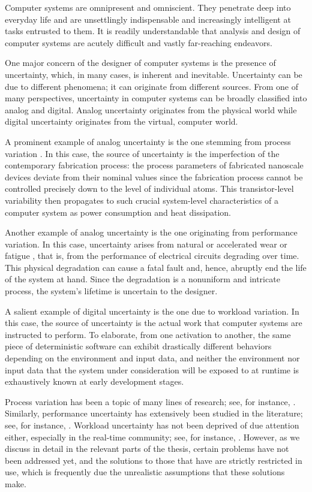 Computer systems are omnipresent and omniscient. They penetrate deep into
everyday life and are unsettlingly indispensable and increasingly intelligent at
tasks entrusted to them. It is readily understandable that analysis and design
of computer systems are acutely difficult and vastly far-reaching endeavors.

One major concern of the designer of computer systems is the presence of
uncertainty, which, in many cases, is inherent and inevitable. Uncertainty can
be due to different phenomena; it can originate from different sources. From one
of many perspectives, uncertainty in computer systems can be broadly classified
into analog and digital. Analog uncertainty originates from the physical world
while digital uncertainty originates from the virtual, computer world.

A prominent example of analog uncertainty is the one stemming from process
variation \cite{srivastava2010}. In this case, the source of uncertainty is the
imperfection of the contemporary fabrication process: the process parameters of
fabricated nanoscale devices deviate from their nominal values since the
fabrication process cannot be controlled precisely down to the level of
individual atoms. This transistor-level variability then propagates to such
crucial system-level characteristics of a computer system as power consumption
and heat dissipation.

Another example of analog uncertainty is the one originating from performance
variation. In this case, uncertainty arises from natural or accelerated wear or
fatigue \cite{jedec2016}, that is, from the performance of electrical circuits
degrading over time. This physical degradation can cause a fatal fault and,
hence, abruptly end the life of the system at hand. Since the degradation is a
nonuniform and intricate process, the system's lifetime is uncertain to the
designer.

A salient example of digital uncertainty is the one due to workload variation.
In this case, the source of uncertainty is the actual work that computer systems
are instructed to perform. To elaborate, from one activation to another, the
same piece of deterministic software can exhibit drastically different behaviors
depending on the environment and input data, and neither the environment nor
input data that the system under consideration will be exposed to at runtime is
exhaustively known at early development stages.

Process variation has been a topic of many lines of research; see, for instance,
\cite{bhardwaj2006, bhardwaj2008, chandra2010, juan2012, lee2013}. Similarly,
performance uncertainty has extensively been studied in the literature; see, for
instance, \cite{coskun2006, huang2009b, das2014c}. Workload uncertainty has not
been deprived of due attention either, especially in the real-time community;
see, for instance, \cite{diaz2002, santinelli2011, quinton2012, tanasa2015}.
However, as we discuss in detail in the relevant parts of the thesis, certain
problems have not been addressed yet, and the solutions to those that have are
strictly restricted in use, which is frequently due the unrealistic assumptions
that these solutions make.

